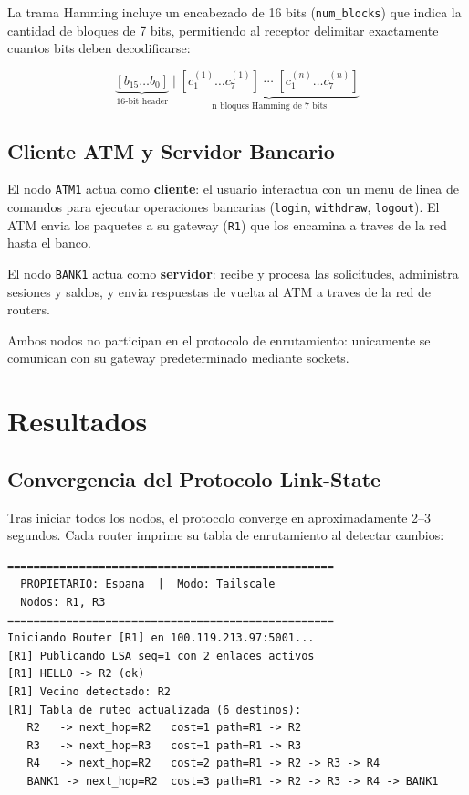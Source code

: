 ﻿\documentclass[12pt, a4paper]{article}
\begin{document}
La trama Hamming incluye un encabezado de 16 bits (\texttt{num\_blocks}) que
indica la cantidad de bloques de 7 bits, permitiendo al receptor delimitar
exactamente cuantos bits deben decodificarse:

\[
\underbrace{[b_{15}\ldots b_0]}_{\text{16-bit header}}
\;\Big|\;
\underbrace{[c_1^{(1)} \ldots c_7^{(1)}] \;\cdots\; [c_1^{(n)} \ldots c_7^{(n)}]}_{\text{n bloques Hamming de 7 bits}}
\]

\subsection{Cliente ATM y Servidor Bancario}

El nodo \texttt{ATM1} actua como \textbf{cliente}: el usuario interactua con
un menu de linea de comandos para ejecutar operaciones bancarias (\texttt{login},
\texttt{withdraw}, \texttt{logout}). El ATM envia los paquetes a su gateway
(\texttt{R1}) que los encamina a traves de la red hasta el banco.

El nodo \texttt{BANK1} actua como \textbf{servidor}: recibe y procesa las
solicitudes, administra sesiones y saldos, y envia respuestas de vuelta al ATM
a traves de la red de routers.

Ambos nodos no participan en el protocolo de enrutamiento: unicamente se
comunican con su gateway predeterminado mediante sockets.

\section{Resultados}

\subsection{Convergencia del Protocolo Link-State}

Tras iniciar todos los nodos, el protocolo converge en aproximadamente 2--3
segundos. Cada router imprime su tabla de enrutamiento al detectar cambios:

\begin{lstlisting}[caption=Salida de consola al iniciar el sistema]
==================================================
  PROPIETARIO: Espana  |  Modo: Tailscale
  Nodos: R1, R3
==================================================
Iniciando Router [R1] en 100.119.213.97:5001...
[R1] Publicando LSA seq=1 con 2 enlaces activos
[R1] HELLO -> R2 (ok)
[R1] Vecino detectado: R2
[R1] Tabla de ruteo actualizada (6 destinos):
   R2   -> next_hop=R2   cost=1 path=R1 -> R2
   R3   -> next_hop=R3   cost=1 path=R1 -> R3
   R4   -> next_hop=R2   cost=2 path=R1 -> R2 -> R3 -> R4
   BANK1 -> next_hop=R2  cost=3 path=R1 -> R2 -> R3 -> R4 -> BANK1
\end{lstlisting}
\end{document}
